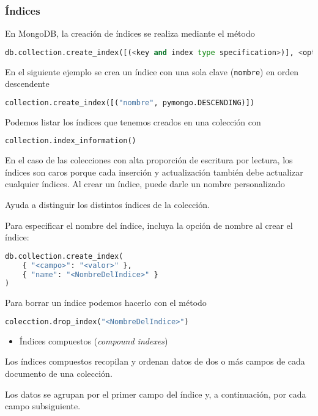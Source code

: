 \subsubsection{Índices}
En MongoDB, la creación de índices se realiza mediante el método 
\begin{lstlisting}[language=python]
db.collection.create_index([(<key and index type specification>)], <options> )
\end{lstlisting}
En el siguiente ejemplo se crea un índice con una sola clave (\texttt{nombre}) en orden descendente
\begin{lstlisting}[language=python]
collection.create_index([("nombre", pymongo.DESCENDING)])
\end{lstlisting}
Podemos listar los índices que tenemos creados en una colección con 
\begin{lstlisting}[language=python]
collection.index_information()
\end{lstlisting}
En el caso de las colecciones con alta proporción de escritura por lectura, los índices son caros porque cada inserción y actualización también debe actualizar cualquier índices.
Al crear un índice, puede darle un nombre personalizado

Ayuda a distinguir los distintos índices de la colección.

Para especificar el nombre del índice, incluya la opción de nombre al crear el índice:
\begin{lstlisting}[language=python]
db.collection.create_index(
	{ "<campo>": "<valor>" },
	{ "name": "<NombreDelIndice>" }
)
\end{lstlisting}
Para borrar un índice podemos hacerlo con el método 
\begin{lstlisting}[language=python]
colecction.drop_index("<NombreDelIndice>")
\end{lstlisting}
\begin{itemize}[label=\color{red}\textbullet, leftmargin=*]
	\item \color{lightblue}Índices compuestos (\textit{compound indexes})
\end{itemize}
Los índices compuestos recopilan y ordenan datos de dos o más campos de cada documento de una colección.

Los datos se agrupan por el primer campo del índice y, a continuación, por cada campo subsiguiente.

